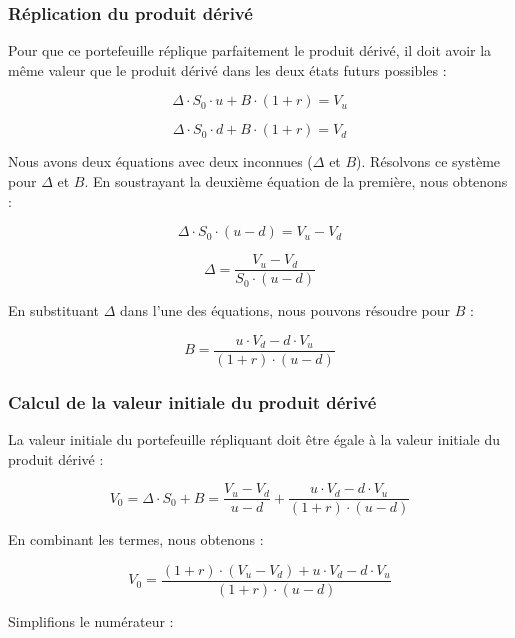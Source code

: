 \documentclass[12pt,a4paper]{article}
\begin{document}
\subsubsection{Réplication du produit dérivé}

Pour que ce portefeuille réplique parfaitement le produit dérivé, il doit avoir la même valeur que le produit dérivé dans les deux états futurs possibles :

\begin{equation}
\Delta \cdot S_0 \cdot u + B \cdot (1 + r) = V_u
\end{equation}

\begin{equation}
\Delta \cdot S_0 \cdot d + B \cdot (1 + r) = V_d
\end{equation}

Nous avons deux équations avec deux inconnues (\(\Delta\) et \(B\)). Résolvons ce système pour \(\Delta\) et \(B\). En soustrayant la deuxième équation de la première, nous obtenons :

\[\Delta \cdot S_0 \cdot (u - d) = V_u - V_d\]

\begin{equation}
\Delta = \frac{V_u - V_d}{S_0 \cdot (u - d)}
\end{equation}

En substituant \(\Delta\) dans l'une des équations, nous pouvons résoudre pour \(B\) :

\begin{equation}
B = \frac{u \cdot V_d - d \cdot V_u}{(1 + r) \cdot (u - d)}
\end{equation}

\subsubsection{Calcul de la valeur initiale du produit dérivé}

La valeur initiale du portefeuille répliquant doit être égale à la valeur initiale du produit dérivé :

\begin{equation}
V_0 = \Delta \cdot S_0 + B = \frac{V_u - V_d}{u - d} + \frac{u \cdot V_d - d \cdot V_u}{(1 + r) \cdot (u - d)}
\end{equation}

En combinant les termes, nous obtenons :

\[V_0 = \frac{(1 + r) \cdot (V_u - V_d) + u \cdot V_d - d \cdot V_u}{(1 + r) \cdot (u - d)}\]

Simplifions le numérateur :
\end{document}
